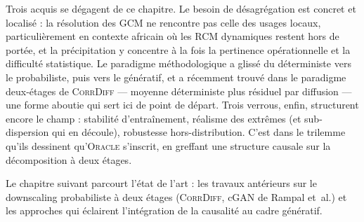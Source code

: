 \documentclass[14pt,a4paper,openany]{extreport}
\newcommand{\Oracle}{\textsc{Oracle}}
\newcommand{\CorrDiff}{\textsc{CorrDiff}}
\begin{document}
Trois acquis se dégagent de ce chapitre. Le besoin de désagrégation est concret et localisé : la résolution des GCM ne rencontre pas celle des usages locaux, particulièrement en contexte africain où les RCM dynamiques restent hors de portée, et la précipitation y concentre à la fois la pertinence opérationnelle et la difficulté statistique. Le paradigme méthodologique a glissé du déterministe vers le probabiliste, puis vers le génératif, et a récemment trouvé dans le paradigme deux-étages de \CorrDiff{} --- moyenne déterministe plus résiduel par diffusion --- une forme aboutie qui sert ici de point de départ. Trois verrous, enfin, structurent encore le champ : stabilité d'entraînement, réalisme des extrêmes (et sub-dispersion qui en découle), robustesse hors-distribution. C'est dans le trilemme qu'ils dessinent qu'\Oracle{} s'inscrit, en greffant une structure causale sur la décomposition à deux étages.

Le chapitre suivant parcourt l'état de l'art : les travaux antérieurs sur le downscaling probabiliste à deux étages (\CorrDiff{}, cGAN de Rampal et~al.) et les approches qui éclairent l'intégration de la causalité au cadre génératif.
\end{document}
